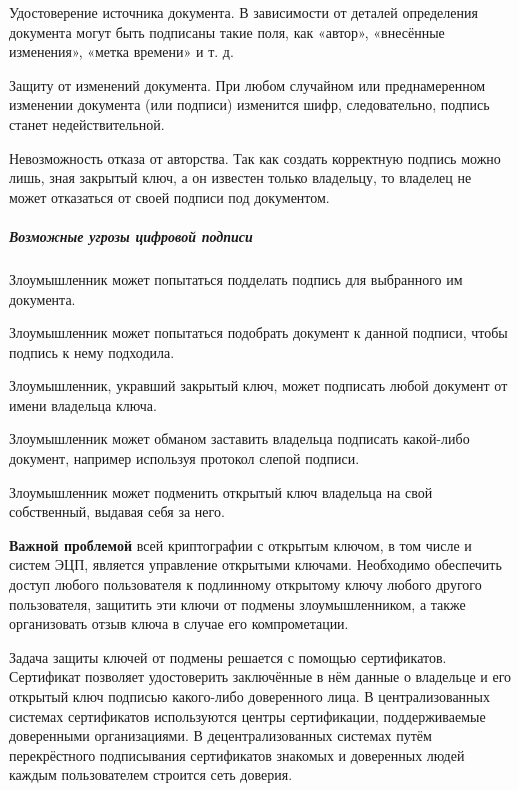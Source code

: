 \begin{Notes}
  \item Удостоверение источника документа. В зависимости от деталей определения
    документа могут быть подписаны такие поля, как «автор», «внесённые
    изменения», «метка времени» и т. д.
  \item Защиту от изменений документа. При любом случайном или преднамеренном
    изменении документа (или подписи) изменится шифр, следовательно, подпись
    станет недействительной.
  \item Невозможность отказа от авторства. Так как
    создать корректную подпись можно лишь, зная закрытый ключ, а он известен
    только владельцу, то владелец не может отказаться от своей подписи под
    документом.
\end{Notes}

\subparagraph{Возможные угрозы цифровой подписи}

\begin{Notes}
  \item Злоумышленник может попытаться подделать подпись для выбранного им документа.
  \item Злоумышленник может попытаться подобрать документ к данной подписи, чтобы подпись к нему подходила.
  \item Злоумышленник, укравший закрытый ключ, может подписать любой документ от имени владельца ключа.
  \item Злоумышленник может обманом заставить владельца подписать какой-либо документ, например используя протокол слепой подписи.
  \item Злоумышленник может подменить открытый ключ владельца на свой собственный, выдавая себя за него.
\end{Notes}

\textbf{Важной проблемой} всей криптографии с открытым ключом, в том числе и
систем ЭЦП, является управление открытыми ключами. Необходимо обеспечить
доступ любого пользователя к подлинному открытому ключу любого другого
пользователя, защитить эти ключи от подмены злоумышленником, а также
организовать отзыв ключа в случае его компрометации.

Задача защиты ключей от подмены решается с помощью сертификатов. Сертификат
позволяет удостоверить заключённые в нём данные о владельце и его открытый
ключ подписью какого-либо доверенного лица. В централизованных системах
сертификатов используются центры сертификации, поддерживаемые доверенными
организациями. В децентрализованных системах путём перекрёстного подписывания
сертификатов знакомых и доверенных людей каждым пользователем строится сеть
доверия.

